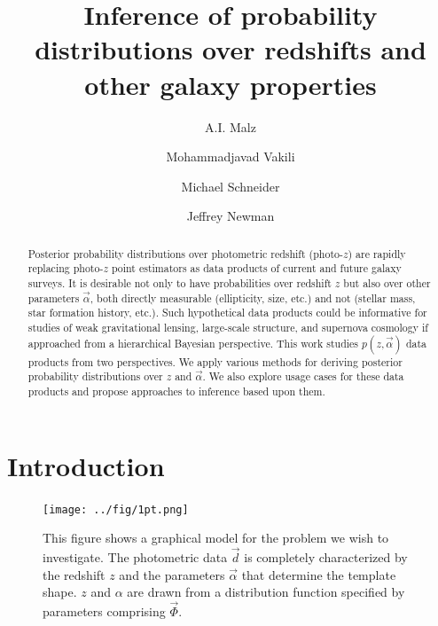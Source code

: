 \documentclass[12pt, preprint]{aastex}
\begin{document}
\title{Inference of probability distributions over redshifts and other galaxy properties}

\author{A.I. Malz}
\author{Mohammadjavad Vakili}
\author{Michael Schneider}
\author{Jeffrey Newman}



\begin{abstract}
Posterior probability distributions over photometric redshift (photo-$z$) are rapidly replacing photo-$z$ point estimators as data products of current and future galaxy surveys.  It is desirable not only to have probabilities over redshift $z$ but also over other parameters $\vec{\alpha}$, both directly measurable (ellipticity, size, etc.) and not (stellar mass, star formation history, etc.).  Such hypothetical data products could be informative for studies of weak gravitational lensing, large-scale structure, and supernova cosmology if approached from a hierarchical Bayesian perspective.  This work studies $p(z,\vec{\alpha})$ data products from two perspectives.  We apply various methods for deriving posterior probability distributions over $z$ and $\vec{\alpha}$.  We also explore usage cases for these data products and propose approaches to inference based upon them.
\end{abstract}

\section{Introduction}

\begin{figure}
\texttt{[image: ../fig/1pt.png]}
\caption{This figure shows a graphical model for the problem we wish to investigate.  The photometric data $\vec{d}$ is completely characterized by the redshift $z$ and the parameters $\vec{\alpha}$ that determine the template shape.  $z$ and $\alpha$ are drawn from a distribution function specified by parameters comprising $\vec{\Phi}$.}
\label{fig:1pt}
\end{figure}
\end{document}
